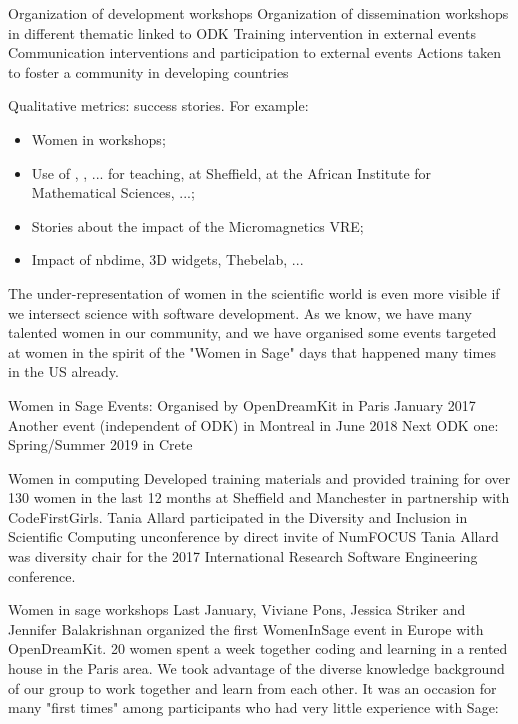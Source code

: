 \begin{Aim 1}
\begin{Aim 2}
\begin{itemize}
    Organization of development workshops
    Organization of dissemination workshops in different thematic linked to ODK
    Training intervention in external events
    Communication interventions and participation to external events
    Actions taken to foster a community in developing countries


Qualitative metrics: success stories. For example:
\begin{itemize}
\item Women in \Sage workshops;
\item Use of \Jupyter, \cocalc, ... for teaching, at Sheffield, at the
  African Institute for Mathematical Sciences, ...;
\item Stories about the impact of the Micromagnetics VRE;
\item Impact of nbdime, 3D widgets, Thebelab, ...
\end{itemize}

   
 The under-representation of women in the scientific world is even more visible if we intersect science with software
  development. As we know, we have many talented women in our community, and we have organised some events targeted at women in the
  spirit of the "Women in Sage" days that happened many times in the US already. %

Women in Sage Events:
    Organised by OpenDreamKit in Paris January 2017
    Another event (independent of ODK) in Montreal in June 2018
    Next ODK one: Spring/Summer 2019 in Crete

Women in computing
    Developed training materials and provided training for over 130 women in the last 12 months at Sheffield and Manchester in partnership 
    with CodeFirstGirls.
    Tania Allard participated in the Diversity and Inclusion in Scientific Computing unconference by direct invite of NumFOCUS
    Tania Allard was diversity chair for the 2017 International Research Software Engineering conference.

Women in sage workshops
    Last January, Viviane Pons, Jessica Striker and Jennifer Balakrishnan organized the first WomenInSage event in Europe with OpenDreamKit.      
    20 women spent a week together coding and learning in a rented house in the Paris area.
    We took advantage of the diverse knowledge background of our group to work together and learn from each other. It was an occasion for 
    many "first times" among participants who had very little experience with Sage:


\end{itemize}
\end{Aim 2}
\end{Aim 1}
